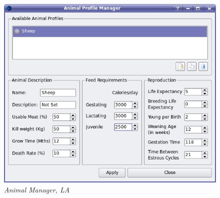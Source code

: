 \begin{figure}[htbp]
  \includegraphics[scale=.39]{./images/animalManager.jpg}
  \caption{\label{fig:animalManager}\textit{Animal Manager, LA}}
\end{figure}

